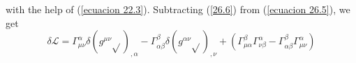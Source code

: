 with the help of (\ref{ecuacion 22.3}). Subtracting (\ref{26.6}) from (\ref{ecuacion 26.5}), we get
\begin{equation}
 \label{ecuacion 26.7}
 \delta \mathcal{L} = \Gamma^\alpha_{\mu\nu} \delta\left( g^{\mu\nu} \sqrt{} \right)_{,\alpha}
 - \Gamma^\beta_{\alpha\beta} \delta\left( g^{\alpha\nu}\sqrt{}\right)_{,\nu}
 + \left( \Gamma^{\beta}_{\mu\alpha} \Gamma^\alpha_{\nu\beta} - \Gamma^{\beta}_{\alpha\beta} \Gamma^\alpha_{\mu\nu} 
\right)
\end{equation}



